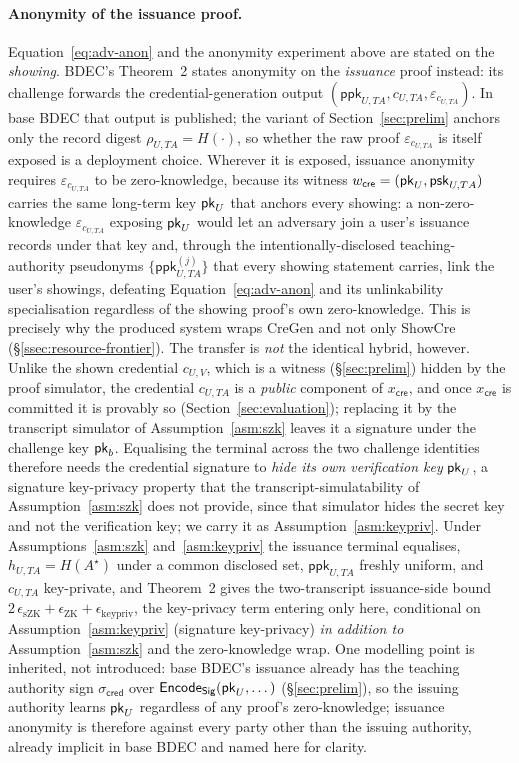 \paragraph{Anonymity of the issuance proof.}
Equation~\eqref{eq:adv-anon} and the anonymity experiment above are stated on the \emph{showing}. BDEC's Theorem~2 states anonymity on the \emph{issuance} proof instead: its challenge forwards the credential-generation output $(\mathsf{ppk}_{U,TA},c_{U,TA},\varepsilon_{c_{U,TA}})$. In base BDEC that output is published; the variant of Section~\ref{sec:prelim} anchors only the record digest $\rho_{U,TA}=H(\cdot)$, so whether the raw proof $\varepsilon_{c_{U,TA}}$ is itself exposed is a deployment choice. Wherever it is exposed, issuance anonymity requires $\varepsilon_{c_{U,TA}}$ to be zero-knowledge, because its witness $w_{\mathsf{cre}}=(\mathsf{pk}_U,\mathsf{psk}_{U,TA})$ carries the same long-term key $\mathsf{pk}_U$ that anchors every showing: a non-zero-knowledge $\varepsilon_{c_{U,TA}}$ exposing $\mathsf{pk}_U$ would let an adversary join a user's issuance records under that key and, through the intentionally-disclosed teaching-authority pseudonyms $\{\mathsf{ppk}_{U,TA}^{(j)}\}$ that every showing statement carries, link the user's showings, defeating Equation~\eqref{eq:adv-anon} and its unlinkability specialisation regardless of the showing proof's own zero-knowledge. This is precisely why the produced system wraps CreGen and not only ShowCre (\S\ref{ssec:resource-frontier}). The transfer is \emph{not} the identical hybrid, however. Unlike the shown credential $c_{U,V}$, which is a witness (\S\ref{sec:prelim}) hidden by the proof simulator, the credential $c_{U,TA}$ is a \emph{public} component of $x_{\mathsf{cre}}$, and once $x_{\mathsf{cre}}$ is committed it is provably so (Section~\ref{sec:evaluation}); replacing it by the transcript simulator of Assumption~\ref{asm:szk} leaves it a signature under the challenge key $\mathsf{pk}_b$. Equalising the terminal across the two challenge identities therefore needs the credential signature to \emph{hide its own verification key} $\mathsf{pk}_U$, a signature key-privacy property that the transcript-simulatability of Assumption~\ref{asm:szk} does not provide, since that simulator hides the secret key and not the verification key; we carry it as Assumption~\ref{asm:keypriv}. Under Assumptions~\ref{asm:szk} and~\ref{asm:keypriv} the issuance terminal equalises, $h_{U,TA}=H(A^\star)$ under a common disclosed set, $\mathsf{ppk}_{U,TA}$ freshly uniform, and $c_{U,TA}$ key-private, and Theorem~2 gives the two-transcript issuance-side bound $2\,\epsilon_{\mathrm{sZK}}+\epsilon_{\mathrm{ZK}}+\epsilon_{\mathrm{keypriv}}$, the key-privacy term entering only here, conditional on Assumption~\ref{asm:keypriv} (signature key-privacy) \emph{in addition to} Assumption~\ref{asm:szk} and the zero-knowledge wrap. One modelling point is inherited, not introduced: base BDEC's issuance already has the teaching authority sign $\sigma_{\mathsf{cred}}$ over $\mathsf{Encode}_{\mathsf{Sig}}(\mathsf{pk}_U,\dots)$ (\S\ref{sec:prelim}), so the issuing authority learns $\mathsf{pk}_U$ regardless of any proof's zero-knowledge; issuance anonymity is therefore against every party other than the issuing authority, already implicit in base BDEC and named here for clarity.

